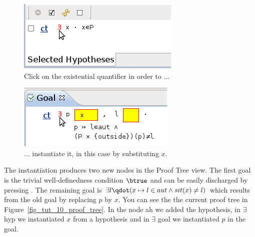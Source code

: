 \begin{figure}[!ht]
\begin{center}
	\includegraphics{img/tutorial/tut_10_instantiate_x.png}
	\caption{Click on the existential quantifier in order to ...}
	\label{fig_tut_10_instantiate_x}
\end{center}
\end{figure}

\begin{figure}[!ht]
\begin{center}
	\includegraphics{img/tutorial/tut_10_instantiate_p.png}
	\caption{... instantiate it, in this case by substituting $x$.}
	\label{fig_tut_10_instantiate_p}
\end{center}
\end{figure}


The instantiation produces two new nodes in the \textsf{Proof Tree} view. The first goal is the trivial well-definedness condition $\btrue$ and
  can be easily discharged by pressing .
The remaining goal is $\exists l\qdot (x \mapsto  l \in  aut \land  sit(x) \neq l)$ which results from the old goal by replacing $p$ by $x$.
You can see the the current proof tree in Figure~\ref{fig_tut_10_proof_tree}. In the node \textsf{ah} we added the hypothesis, in \textsf{$\exists$ hyp}
  we instantiated $x$ from a hypothesis and in \textsf{$\exists$ goal} we instantiated $p$ in the goal.

